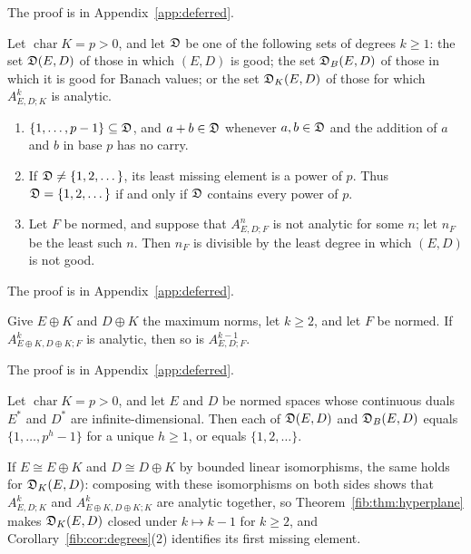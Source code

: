 The proof is in Appendix~\ref{app:deferred}.

\begin{corollary}\label{fib:cor:degrees}
Let $\operatorname{char}K=p>0$, and let $\mathfrak D$ be one of the following sets of degrees $k\ge1$: the set $\mathfrak D(E,D)$ of
those in which $(E,D)$ is good; the set $\mathfrak D_B(E,D)$ of those in which it is good for Banach values; or the set
$\mathfrak D_K(E,D)$ of those for which $A^k_{E,D;K}$ is analytic.
\begin{enumerate}
\item $\{1,\dots,p-1\}\subseteq\mathfrak D$, and $a+b\in\mathfrak D$ whenever $a,b\in\mathfrak D$ and the addition of $a$
and $b$ in base $p$ has no carry.
\item If $\mathfrak D\ne\{1,2,\dots\}$, its least missing element is a power of $p$. Thus
$\mathfrak D=\{1,2,\dots\}$ if and only if $\mathfrak D$ contains every power of $p$.
\item Let $F$ be normed, and suppose that $A^n_{E,D;F}$ is not analytic for some $n$; let $n_F$ be the least such $n$.
Then $n_F$ is divisible by the least degree in which $(E,D)$ is not good.
\end{enumerate}
\end{corollary}

The proof is in Appendix~\ref{app:deferred}.

\begin{theorem}\label{fib:thm:hyperplane}
Give $E\oplus K$ and $D\oplus K$ the maximum norms, let $k\ge2$, and let $F$ be normed. If
$A^k_{E\oplus K,D\oplus K;F}$ is analytic, then so is $A^{k-1}_{E,D;F}$.
\end{theorem}

The proof is in Appendix~\ref{app:deferred}.

\begin{theorem}\label{cmb:thm:initial-segments}
Let $\operatorname{char}K=p>0$, and let $E$ and $D$ be normed spaces whose continuous duals $E^*$ and $D^*$ are
infinite-dimensional. Then each of $\mathfrak D(E,D)$ and $\mathfrak D_B(E,D)$ equals $\{1,\dots,p^h-1\}$ for a unique $h\ge1$, or
equals $\{1,2,\dots\}$.
\end{theorem}

If $E\cong E\oplus K$ and $D\cong D\oplus K$ by bounded linear isomorphisms, the same holds for $\mathfrak D_K(E,D)$: composing with
these isomorphisms on both sides shows that $A^k_{E,D;K}$ and $A^k_{E\oplus K,D\oplus K;K}$ are analytic together, so
Theorem~\ref{fib:thm:hyperplane} makes $\mathfrak D_K(E,D)$ closed under $k\mapsto k-1$ for $k\ge2$, and
Corollary~\ref{fib:cor:degrees}(2) identifies its first missing element.

